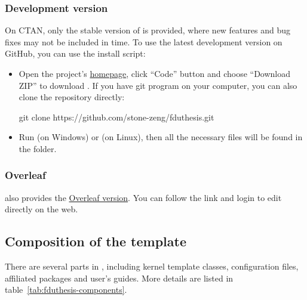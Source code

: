 \documentclass{fdudoc}
\begin{document}
\subsubsection{Development version}

On CTAN, only the stable version of  is provided, where new features and
bug fixes may not be included in time. To use the latest development version on GitHub,
you can use the install script:
\begin{itemize}
  \item Open the project's \href{https://github.com/stone-zeng/fduthesis}{homepage}, click
    ``Code'' button and choose ``Download ZIP'' to download .
    If you have git program on your computer, you can also clone the repository directly:
    \begin{shellexample}[gobble=5,alsoletter={.},morekeywords={git,clone}]
      git clone https://github.com/stone-zeng/fduthesis.git
    \end{shellexample}
  \item Run  (on Windows) or  (on Linux),
    then all the necessary files will be found in the  folder.
\end{itemize}

\subsubsection{Overleaf}

 also provides the \href{https://www.overleaf.com/latex/templates/fduthesis-latex-thesis-template-for-fudan-university/svtdhhstkmkt}{Overleaf version}.
You can follow the link and login to edit directly on the web.

\subsection{Composition of the template}

There are several parts in , including kernel template
classes, configuration files, affiliated packages and user's guides.
More details are listed in table~\ref{tab:fduthesis-components}.
\end{document}
